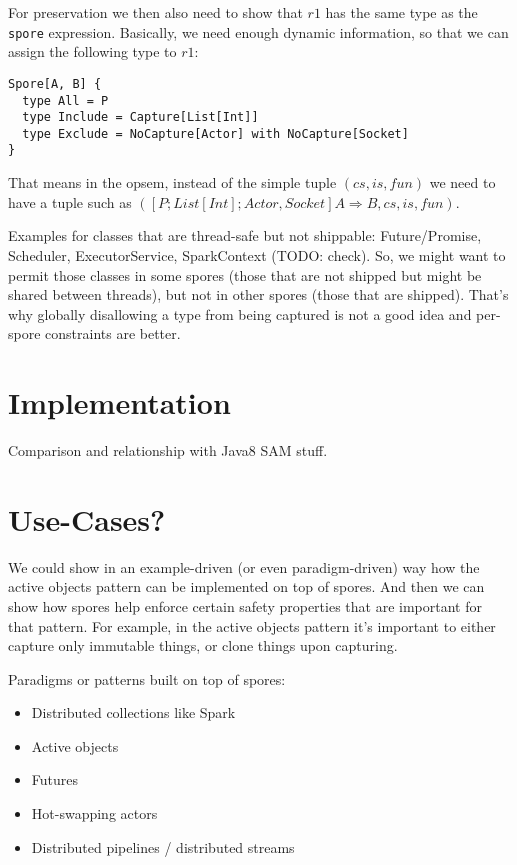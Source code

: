 \documentclass{llncs}
\begin{document}
For preservation we then also need to show that $r1$ has the same type as the
\verb|spore| expression. Basically, we need enough dynamic information, so
that we can assign the following type to $r1$:

\begin{lstlisting}
Spore[A, B] {
  type All = P
  type Include = Capture[List[Int]]
  type Exclude = NoCapture[Actor] with NoCapture[Socket]
}
\end{lstlisting}

That means in the opsem, instead of the simple tuple $(cs, is, fun)$ we need to
have a tuple such as
$([{P} ; {List[Int]} ; {Actor, Socket}] A \Rightarrow B, cs, is, fun)$.

Examples for classes that are thread-safe but not shippable: Future/Promise,
Scheduler, ExecutorService, SparkContext (TODO: check). So, we might want to
permit those classes in some spores (those that are not shipped but might be
shared between threads), but not in other spores (those that are shipped).
That's why globally disallowing a type from being captured is not a good idea
and per-spore constraints are better.


\section{Implementation}

Comparison and relationship with Java8 SAM stuff.

\section{Use-Cases?}

We could show in an example-driven (or even paradigm-driven) way how the
active objects pattern can be implemented on top of spores. And then we can
show how spores help enforce certain safety properties that are important for
that pattern. For example, in the active objects pattern it's important to
either capture only immutable things, or clone things upon capturing.

Paradigms or patterns built on top of spores:

\begin{itemize}
\item Distributed collections like Spark
\item Active objects
\item Futures
\item Hot-swapping actors
\item Distributed pipelines / distributed streams
\end{itemize}
\end{document}
